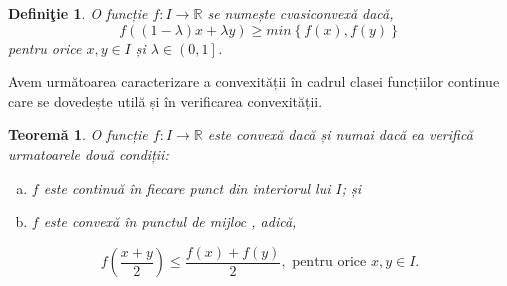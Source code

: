 \documentclass[a4paper,12pt,oneside]{report}
\newtheorem{definition}{Defini\c tie}
\newtheorem{theorem}{Teorem\u a}
\begin{document}
\begin{definition}
O funcție \(f: I \rightarrow \mathbb{R}\) se numește cvasiconvexă dacă,
 \begin{displaymath}
  f\left ( \left ( 1-\lambda  \right )x + \lambda y \right )\geq  min\left \{ f\left ( x \right ), f\left ( y \right ) \right \}
\end{displaymath}
pentru orice  \(x, y \in I\) și \(\lambda  \in \left ( 0,1 \right ]\).
\end{definition}
	 Avem următoarea caracterizare a convexității în cadrul clasei funcțiilor continue care se dovedește utilă și în verificarea convexității.
\begin{theorem}
O funcție \(f : I \rightarrow \mathbb{R}\) este convexă dacă și numai dacă ea verifică urmatoarele două condiții:
\begin{enumerate}[a)]
\item \(f\) este continuă în fiecare punct din interiorul lui \(I\); și
\item \(f\) este convexă în punctul de mijloc , adică,
\end{enumerate}
\begin{displaymath}
  f\left ( \frac{x+y}{2} \right )\leq \frac{f\left ( x \right )+f\left ( y \right )}{2}, \text{ pentru orice } x, y \in I.
\end{displaymath}
\end{theorem}
\end{document}
